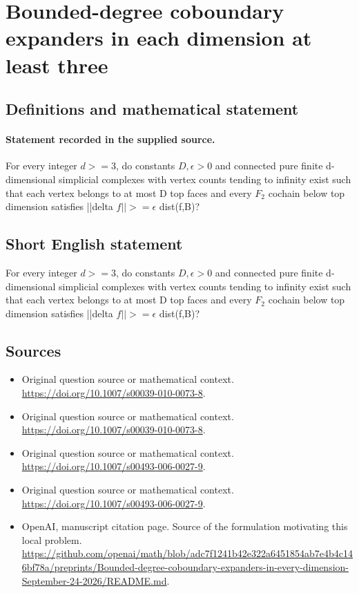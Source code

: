 \documentclass[11pt]{article}
\begin{document}
\section*{Bounded-degree coboundary expanders in each dimension at least three}\label{30007081}
\subsection{Definitions and mathematical statement}
\paragraph{Statement recorded in the supplied source.}
For every integer $d>=3$, do constants $D,\epsilon >0$ and connected pure finite d-dimensional simplicial complexes with vertex counts tending to infinity exist such that each vertex belongs to at most D top faces and every $F_2$ cochain below top dimension satisfies ||delta $f||>=\epsilon $ dist(f,B)?
\subsection{Short English statement}
For every integer $d>=3$, do constants $D,\epsilon >0$ and connected pure finite d-dimensional simplicial complexes with vertex counts tending to infinity exist such that each vertex belongs to at most D top faces and every $F_2$ cochain below top dimension satisfies ||delta $f||>=\epsilon $ dist(f,B)?
\subsection{Sources}
\begin{itemize}
\item[S1] Original question source or mathematical context.
\url{https://doi.org/10.1007/s00039-010-0073-8}.
\item[S2] Original question source or mathematical context.
\url{https://doi.org/10.1007/s00039-010-0073-8}.
\item[S3] Original question source or mathematical context.
\url{https://doi.org/10.1007/s00493-006-0027-9}.
\item[S4] Original question source or mathematical context.
\url{https://doi.org/10.1007/s00493-006-0027-9}.
\item[S5] OpenAI, manuscript citation page. Source of the formulation motivating this local problem.
\url{https://github.com/openai/math/blob/adc7f1241b42e322a6451854ab7e4b4c146bf78a/preprints/Bounded-degree-coboundary-expanders-in-every-dimension-September-24-2026/README.md}.
\end{itemize}
\end{document}
